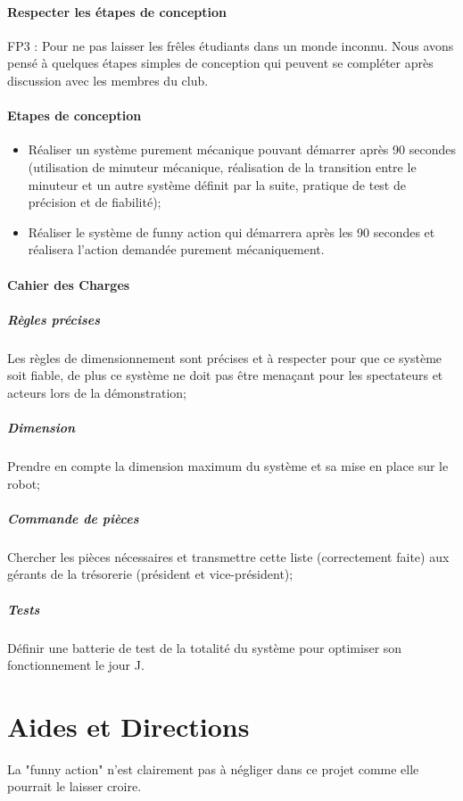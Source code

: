 \documentclass[fleqn,10pt]{SelfArx} %
\begin{document}
\paragraph{Respecter les étapes de conception}
FP3 : Pour ne pas laisser les frêles étudiants dans un monde inconnu. Nous avons pensé à quelques étapes simples de conception qui peuvent se compléter après discussion avec les membres du club.

\paragraph{Etapes de conception}
\begin{itemize}
\item Réaliser un système purement mécanique pouvant démarrer après 90 secondes (utilisation de minuteur mécanique, réalisation de la transition entre le minuteur et un autre système définit par la suite, pratique de test de précision et de fiabilité);
\item Réaliser le système de funny action qui démarrera après les 90 secondes et réalisera l'action demandée purement mécaniquement.
\end{itemize}

\paragraph{Cahier des Charges}
\subparagraph{Règles précises}
Les règles de dimensionnement  sont précises et à respecter pour que ce système soit fiable, de plus ce système ne doit pas être menaçant pour les spectateurs et acteurs lors de la démonstration;
\subparagraph{Dimension}
Prendre en compte la dimension maximum du système et sa mise en place sur le robot;
\subparagraph{Commande de pièces}
Chercher les pièces nécessaires et transmettre cette liste (correctement faite) aux gérants de la trésorerie (président et vice-président);
\subparagraph{Tests}
Définir une batterie de test de la totalité du système pour optimiser son fonctionnement le jour J.	




\section{Aides et Directions}

La "funny action" n'est clairement pas à négliger dans ce projet comme elle pourrait le laisser croire.
	
\end{document}
